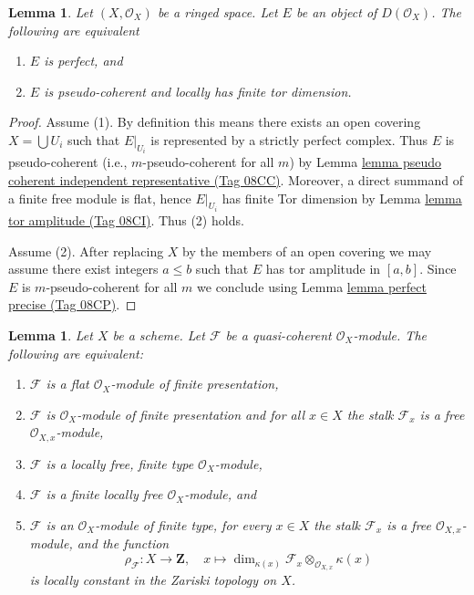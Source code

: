 \documentclass{amsart}
\theoremstyle{plain}
\newtheorem{lemma}[subsection]{Lemma}
\theoremstyle{definition}
\theoremstyle{remark}
\numberwithin{equation}{subsection}
\begin{document}
\begin{lemma}
\label{cohomology-lemma-perfect}
Let $(X, \mathcal{O}_X)$ be a ringed space.
Let $E$ be an object of $D(\mathcal{O}_X)$.
The following are equivalent
\begin{enumerate}
\item $E$ is perfect, and
\item $E$ is pseudo-coherent and locally has finite tor dimension.
\end{enumerate}
\end{lemma}

\begin{proof}
Assume (1). By definition this means there exists an open covering
$X = \bigcup U_i$ such that $E|_{U_i}$ is represented by a
strictly perfect complex. Thus $E$ is pseudo-coherent (i.e.,
$m$-pseudo-coherent for all $m$) by
Lemma \href{https://stacks.math.columbia.edu/tag/08CC}{lemma pseudo coherent independent representative (Tag 08CC)}.
Moreover, a direct summand of a finite free module is flat, hence
$E|_{U_i}$ has finite Tor dimension by
Lemma \href{https://stacks.math.columbia.edu/tag/08CI}{lemma tor amplitude (Tag 08CI)}. Thus (2) holds.

\medskip\noindent
Assume (2). After replacing $X$ by the members of an open covering
we may assume there exist integers $a \leq b$ such that $E$
has tor amplitude in $[a, b]$. Since $E$ is $m$-pseudo-coherent
for all $m$ we conclude using Lemma \href{https://stacks.math.columbia.edu/tag/08CP}{lemma perfect precise (Tag 08CP)}.
\end{proof}


\begin{lemma}
\label{properties-lemma-finite-locally-free}
Let $X$ be a scheme.
Let $\mathcal{F}$ be a quasi-coherent $\mathcal{O}_X$-module.
The following are equivalent:
\begin{enumerate}
\item $\mathcal{F}$ is a flat $\mathcal{O}_X$-module of finite presentation,
\item $\mathcal{F}$ is $\mathcal{O}_X$-module of finite presentation and
for all $x \in X$ the stalk $\mathcal{F}_x$ is a free
$\mathcal{O}_{X, x}$-module,
\item $\mathcal{F}$ is a locally free, finite type $\mathcal{O}_X$-module,
\item $\mathcal{F}$ is a finite locally free $\mathcal{O}_X$-module, and
\item $\mathcal{F}$ is an $\mathcal{O}_X$-module of finite type,
for every $x \in X$ the stalk $\mathcal{F}_x$ is a free
$\mathcal{O}_{X, x}$-module, and the function
$$
\rho_\mathcal{F} : X \to \mathbf{Z}, \quad
x \longmapsto
\dim_{\kappa(x)} \mathcal{F}_x \otimes_{\mathcal{O}_{X, x}} \kappa(x)
$$
is locally constant in the Zariski topology on $X$.
\end{enumerate}
\end{lemma}
\end{document}
